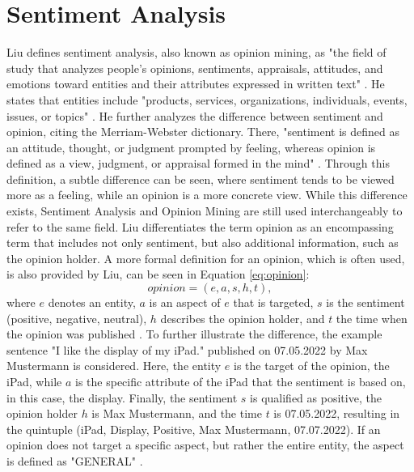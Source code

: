 
\section{Sentiment Analysis}
Liu defines sentiment analysis, also known as opinion mining, as "the field of study that analyzes people's opinions, sentiments, appraisals, attitudes, and emotions toward entities and their attributes expressed in written text" \cite[p.~1]{liu_2015}. He states that entities include "products, services, organizations, individuals, events, issues, or topics" \cite[p.~1]{liu_2015}. He further analyzes the difference between sentiment and opinion, citing the Merriam-Webster dictionary. There, "sentiment is defined as an attitude, thought, or judgment prompted by feeling, whereas opinion is defined as a view, judgment, or appraisal formed in the mind" \cite[p.~2]{liu_2015}. Through this definition, a subtle difference can be seen, where sentiment tends to be viewed more as a feeling, while an opinion is a more concrete view. While this difference exists, Sentiment Analysis and Opinion Mining are still used interchangeably to refer to the same field. Liu differentiates the term opinion as an encompassing term that includes not only sentiment, but also additional information, such as the opinion holder. A more formal definition for an opinion, which is often used, is also provided by Liu, can be seen in Equation \eqref{eq:opinion}:
\begin{equation}
    opinion = (e, a, s, h, t),
    \label{eq:opinion}
\end{equation}
where $e$ denotes an entity, $a$ is an aspect of $e$ that is targeted, $s$ is the sentiment (positive, negative, neutral), $h$ describes the opinion holder, and $t$ the time when the opinion was published \cite{liu_2015}. To further illustrate the difference, the example sentence "I like the display of my iPad." published on 07.05.2022 by Max Mustermann is considered. Here, the entity $e$ is the target of the opinion, the iPad, while $a$ is the specific attribute of the iPad that the sentiment is based on, in this case, the display. Finally, the sentiment $s$ is qualified as positive, the opinion holder $h$ is Max Mustermann, and the time $t$ is 07.05.2022, resulting in the quintuple (iPad, Display, Positive, Max Mustermann, 07.07.2022). If an opinion does not target a specific aspect, but rather the entire entity, the aspect is defined as "GENERAL" \cite{liu_2015}. 

